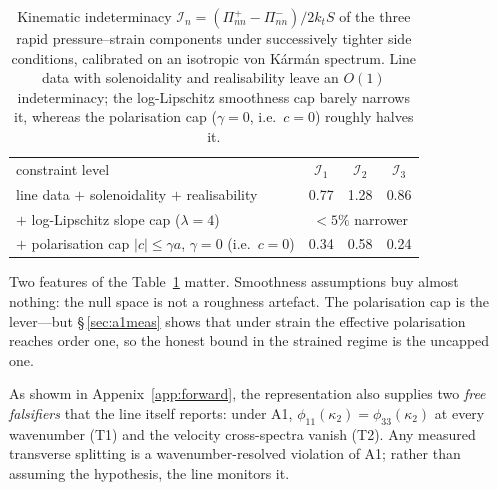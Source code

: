 \documentclass[lineno]{JFM-FLM_Au}
\begin{document}
\begin{table}
  \centering\small
  \begin{tabular}{lccc}
  constraint level & $\mathcal I_1$ & $\mathcal I_2$ & $\mathcal I_3$\\[2pt]
  line data $+$ solenoidality $+$ realisability & 0.77 & 1.28 & 0.86\\
  $+$ log-Lipschitz slope cap ($\lambda=4$) & \multicolumn{3}{c}{$<5\%$ narrower}\\
  $+$ polarisation cap $|c|\le\gamma a$, $\gamma=0$ (i.e.\ $c=0$) & 0.34 & 0.58 & 0.24\\
  \end{tabular}
  \caption{Kinematic indeterminacy
  $\mathcal I_n=(\Pi^{+}_{nn}-\Pi^{-}_{nn})/2k_tS$ of the three rapid
  pressure--strain components under successively tighter side conditions,
  calibrated on an isotropic von K\'arm\'an spectrum. Line data with
  solenoidality and realisability leave an $O(1)$ indeterminacy; the
  log-Lipschitz smoothness cap barely narrows it, whereas the polarisation
  cap ($\gamma=0$, i.e.\ $c=0$) roughly halves it.}
  \label{tab:indeterminacy}
\end{table}
Two features of the Table~\ref{tab:indeterminacy} matter. Smoothness assumptions buy almost
nothing: the null space is not a roughness artefact. The polarisation cap
is the lever---but \S\,\ref{sec:a1meas} shows that under strain the
effective polarisation reaches order one, so the honest bound in the
strained regime is the uncapped one.

As showm in Appenix~\ref{app:forward}, the representation also supplies two \emph{free falsifiers} that the line
itself reports: under A1, $\phi_{11}(\kappa_2)=\phi_{33}(\kappa_2)$ at
every wavenumber (T1) and the velocity cross-spectra vanish (T2). Any
measured transverse splitting is a wavenumber-resolved violation of A1;
rather than assuming the hypothesis, the line monitors it.
\end{document}
